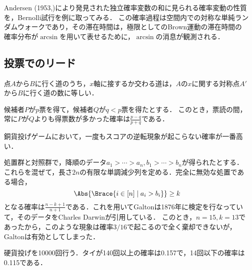 \documentclass[uplatex,dvipdfmx]{jsreport}
\begin{document}
\begin{tcolorbox}[colframe=ForestGreen, colback=ForestGreen!10!white,breakable,colbacktitle=ForestGreen!40!white,coltitle=black,fonttitle=\bfseries\sffamily,
title=]
    Andersen (1953,\cite{Andersen})により発見された独立確率変数の和に見られる確率変動の性質を，Bernolli試行を例に取ってみる．
    この確率過程は空間内での対称な単純ランダムウォークであり，その滞在時間は，極限としてのBrown運動の滞在時間の
    確率分布が$\arcsin$を用いて表せるために，$\arcsin$の消息が観測される．
\end{tcolorbox}

\subsection{投票でのリード}

\begin{lemma}[鏡像原理]
    点$A$から$B$に行く道のうち，$x$軸に接するか交わる道は，$A$の$x$に関する対称点$A'$から$B$に行く道の数に等しい．
\end{lemma}

\begin{corollary}
    候補者$P$が$p$票を得て，候補者$Q$が$q<p$票を得たとする．
    このとき，票読の間，常に$P$が$Q$よりも得票数が多かった確率は$\frac{p-q}{p+q}$である．
\end{corollary}

\begin{corollary}
    銅貨投げゲームにおいて，一度もスコアの逆転現象が起こらない確率が一番高い．
\end{corollary}

\begin{example}[リードの逆転は思ったよりも起こらない]
    処置群と対照群で，降順のデータ$a_1>\cdots>a_n,b_1>\cdots>b_n$が得られたとする．
    これらを混ぜて，長さ$2n$の有限な単調減少列を定める．完全に無効な処置である場合，
    \[\Abs{\Brace{i\in[n]\mid a_i>b_i}}\ge k\]
    となる確率は$\frac{n-k+1}{n+1}$である．これを用いてGaltonは1876年に検定を行なっていて，そのデータをCharles Darwinが引用している．
    このとき，$n=15,k=13$であったから，このような現象は確率$3/16$で起こるので全く棄却できないが，Galtonは有効としてしまった．
\end{example}

\begin{example}[タイも驚くほど起こらない]
    硬貨投げを10000回行う．タイが140回以上の確率は0.157で，14回以下の確率は0.115である．
\end{example}
\end{document}
